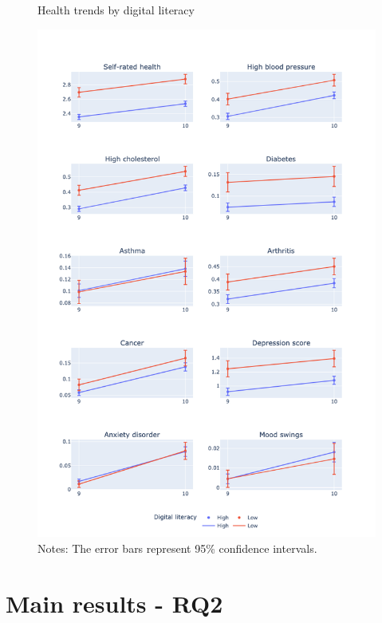 \begin{figure}
    \centering
    \caption{Health trends by digital literacy}
    \label{fig:desc_stats_rq2}
    \includegraphics[width=\textwidth]{figures/desc_stats_q2.png}
    \caption*{Notes: The error bars represent 95\% confidence intervals.}
\end{figure}


\section{Main results - RQ2}


